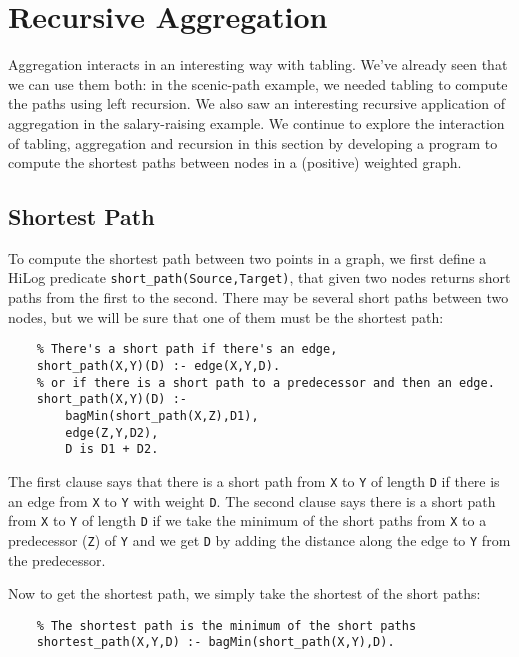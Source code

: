 \section{Recursive Aggregation}

Aggregation interacts in an interesting way with tabling.  We've
already seen that we can use them both: in the scenic-path example, we
needed tabling to compute the paths using left recursion.  We also saw
an interesting recursive application of aggregation in the
salary-raising example.  We continue to explore the interaction of
tabling, aggregation and recursion in this section by developing a
program to compute the shortest paths between nodes in a (positive)
weighted graph.

\subsection{Shortest Path}

To compute the shortest path between two points in a graph, we first
define a HiLog predicate \verb|short_path(Source,Target)|, that given
two nodes returns short paths from the first to the second.  There may
be several short paths between two nodes, but we will be sure that one
of them must be the shortest path:
\begin{verbatim}
    % There's a short path if there's an edge, 
    short_path(X,Y)(D) :- edge(X,Y,D).
    % or if there is a short path to a predecessor and then an edge.
    short_path(X,Y)(D) :-
        bagMin(short_path(X,Z),D1),
        edge(Z,Y,D2),
        D is D1 + D2.
\end{verbatim}
The first clause says that there is a short path from \verb|X| to
\verb|Y| of length \verb|D| if there is an edge from \verb|X| to
\verb|Y| with weight \verb|D|.  The second clause says there is a
short path from \verb|X| to \verb|Y| of length \verb|D| if we take the
minimum of the short paths from \verb|X| to a predecessor (\verb|Z|)
of \verb|Y| and we get \verb|D| by adding the distance along the edge
to \verb|Y| from the predecessor.

Now to get the shortest path, we simply take the shortest of the short
paths:
\begin{verbatim}
    % The shortest path is the minimum of the short paths
    shortest_path(X,Y,D) :- bagMin(short_path(X,Y),D).
\end{verbatim}

